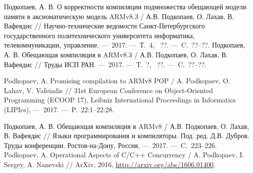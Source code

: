 \renewcommand{\refname}{Статьи из ``Перечня рецензируемых научных изданий, в которых должны быть опубликованы основные научные результаты диссертаций на соискание ученой степени кандидата наук, на соискание ученой степени доктора наук'', сформированного согласно требованиям, установленным Министерством образования и науки Российской Федерации}
\begin{thebibliography}{99}
 Подкопаев, А. В. О корректности компиляции подмножества обещающей модели памяти в аксиоматическую модель ARMv8.3 / А.В. Подкопаев, О. Лахав, В. Вафеядис // Научно-технические ведомости Санкт-Петербургского государственного политехнического университета информатика, телекоммуникации, управление. ---~2017. ---~Т.~4, \textnumero~??. ---~C.~??--??.
 Подкопаев, А. В. Обещающая компиляция в ARMv8.3 / А.В. Подкопаев, О. Лахав, В. Вафеядис // Труды ИСП РАН. ---~2017. ---~Т.~?, \textnumero~??. ---~C.~??--??.
\setcounter{firstbib}{\value{enumiv}}
\end{thebibliography}

\renewcommand{\refname}{Статьи в изданиях, входящих в базы цитирования Web of Science и SCOPUS}
\begin{thebibliography}{99}
\setcounter{enumiv}{\value{firstbib}}
 Podkopaev, A. Promising compilation to ARMv8 POP / A. Podkopaev, O. Lahav, V. Vafeiadis // 31st European Conference on Object-Oriented Programming (ECOOP 17), Leibniz International Proceedings in Informatics (LIPIcs),  ---~2017. ---~P.~22:1--22:28.
\setcounter{firstbib}{\value{enumiv}}
\end{thebibliography}

\renewcommand{\refname}{Статьи в других изданиях}
\begin{thebibliography}{99}
\setcounter{enumiv}{\value{firstbib}}
 Подкопаев, А. В. Обещающая компиляция в ARMv8 / А.В. Подкопаев, О. Лахав, В. Вафеядис // Языки программирования и компиляторы. Под. ред. Д.В. Дубров. Труды конференции. Ростов-на-Дону, Россия, ---~2017. ---~C.~223--226.
 Podkopaev, A. Operational Aspects of {C/C++} Concurrency / A. Podkopaev, I. Sergey, A. Nanevski // ArXiv, 2016, 
  \url{http://arxiv.org/abs/1606.01400}.
\end{thebibliography}
